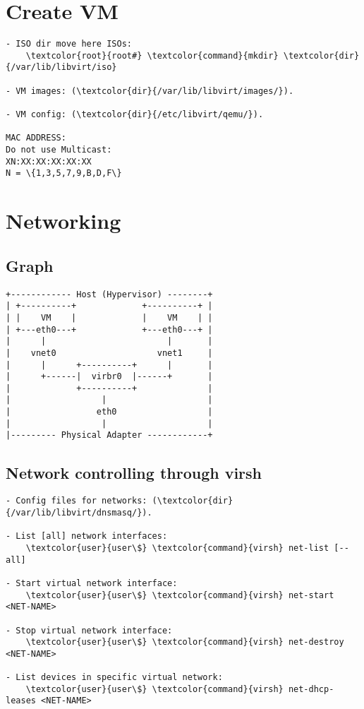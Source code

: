 \documentclass[10pt, a4paper, onecolumn, openany]{book} %
\begin{document}
\section{Create VM}
\begin{Verbatim}[commandchars=\\\{\}]
- ISO dir move here ISOs:
    \textcolor{root}{root#} \textcolor{command}{mkdir} \textcolor{dir}{/var/lib/libvirt/iso}

- VM images: (\textcolor{dir}{/var/lib/libvirt/images/}).

- VM config: (\textcolor{dir}{/etc/libvirt/qemu/}).

MAC ADDRESS:
Do not use Multicast:
XN:XX:XX:XX:XX:XX
N = \{1,3,5,7,9,B,D,F\}
\end{Verbatim}

\section{Networking}
\subsection{Graph}
\begin{Verbatim}[commandchars=\\\{\}]
+------------ Host (Hypervisor) --------+
| +----------+             +----------+ |
| |    VM    |             |    VM    | |
| +---eth0---+             +---eth0---+ |
|      |                        |       |
|    vnet0                    vnet1     |
|      |      +----------+      |       |
|      +------|  virbr0  |------+       |
|             +----------+              |
|                  |                    |
|                 eth0                  |
|                  |                    |
|--------- Physical Adapter ------------+
\end{Verbatim}
\subsection{Network controlling through virsh}
\begin{Verbatim}[commandchars=\\\{\}]
- Config files for networks: (\textcolor{dir}{/var/lib/libvirt/dnsmasq/}).

- List [all] network interfaces:
    \textcolor{user}{user\$} \textcolor{command}{virsh} net-list [--all]

- Start virtual network interface:
    \textcolor{user}{user\$} \textcolor{command}{virsh} net-start <NET-NAME>

- Stop virtual network interface:
    \textcolor{user}{user\$} \textcolor{command}{virsh} net-destroy <NET-NAME>
    
- List devices in specific virtual network:
    \textcolor{user}{user\$} \textcolor{command}{virsh} net-dhcp-leases <NET-NAME>
\end{Verbatim}
\end{document}
